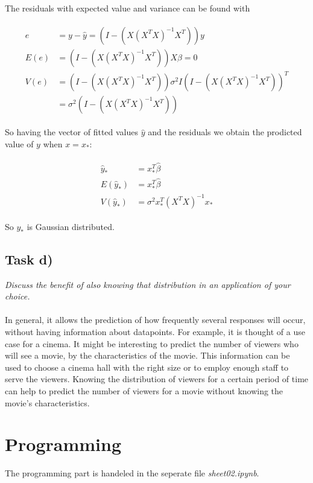 \documentclass{article}
\begin{document}
The residuals with expected value and variance can be found with

\begin{align}
\begin{aligned}
e &= y - \hat y = (I - (X (X^TX)^{-1}X^T))y\\
E(e) &=(I - (X (X^TX)^{-1}X^T))X\beta = 0\\
V(e) &= (I - (X (X^TX)^{-1}X^T))\sigma^2 I (I - (X (X^TX)^{-1}X^T))^T \\
       &= \sigma^2(I - (X (X^TX)^{-1}X^T))
\end{aligned}
\end{align}

So having the vector of fitted values $\hat y$ and the residuals we obtain the prodicted value of $y$ when $x=x_*$:

\begin{align}
\begin{aligned}
\hat y_* &= x_*^T \hat\beta\\
E(\hat y_*) &= x_*^T\hat \beta\\
V(\hat y_*) &= \sigma^2 x_*^T (X^TX)^{-1}x_*
\end{aligned}
\end{align}

So $y_*$ is Gaussian distributed.

\subsection*{Task d)}
\textit{Discuss the benefit of also knowing that distribution in an application of your choice.}\\
\\
In general, it allows the prediction of how frequently several responses will occur, without having information about datapoints. For example, it is thought of a use case for a cinema. It might be interesting to predict the number of viewers who will see a movie, by the characteristics of the movie. This information can be used to choose a cinema hall with the right size or to employ enough staff to serve the viewers. Knowing the distribution of viewers for a certain period of time can help to predict the number of viewers for a movie without knowing the movie's characteristics.


\section{Programming}


The programming part is handeled in the seperate file \textit{sheet02.ipynb}.


%

%

\end{document}
